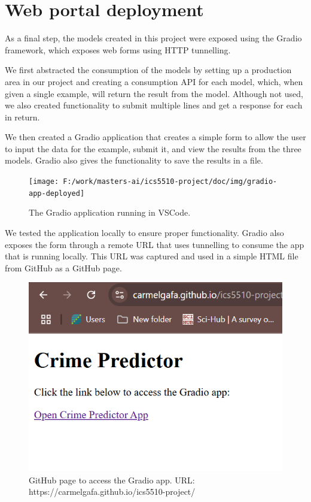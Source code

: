 \section{Web portal deployment}

As a final step, the models created in this project were exposed using the Gradio framework, which exposes web forms using HTTP tunnelling.

We first abstracted the consumption of the models by setting up a production area in our project and creating a consumption API for each model, which, when given a single example, will return the result from the model. Although not used, we also created functionality to submit multiple lines and get a response for each in return.

We then created a Gradio application that creates a simple form to allow the user to input the data for the example, submit it, and view the results from the three models. Gradio also gives the functionality to save the results in a file.

\begin{figure}[H]
	\centering
	\texttt{[image: F:/work/masters-ai/ics5510-project/doc/img/gradio-app-deployed]}
	\caption{The Gradio application running in VSCode.}
	\label{fig:gradio-app-deployed}
\end{figure}

We tested the application locally to ensure proper functionality. Gradio also exposes the form through a remote URL that uses tunnelling to consume the app that is running locally. This URL was captured and used in a simple HTML file from GitHub as a GitHub page.


\begin{figure}[H]
	\centering
	\includegraphics[width=0.7\linewidth]{img/gradio-github-page}
	\caption{GitHub page to access the Gradio app. URL: https://carmelgafa.github.io/ics5510-project/}
	\label{fig:gradio-github-page}
\end{figure}



